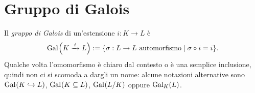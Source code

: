 %
%
%
%


\section{Gruppo di Galois}

\begin{defi}
Il {\em gruppo di Galois} di un'estensione $i : K \to L$ è
\[\Gal{K \mor i L} := \{\sigma : L \to L \text{ automorfismo} \mid \sigma \circ i = i \} .\]
Qualche volta l'omomorfismo è chiaro dal contesto o è una semplice inclusione, quindi non ci si scomoda a dargli un nome: alcune notazioni alternative sono $\Gal{K \hookrightarrow L}$, $\Gal{K \subseteq L}$, $\Gal{L/K}$ oppure $\Gal[K]{L}$.
\end{defi}

